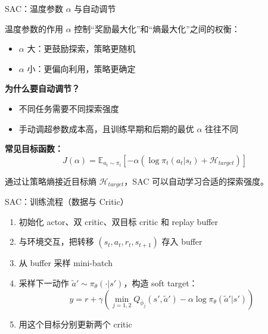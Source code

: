 \documentclass{beamer}
\begin{document}
\begin{frame}{SAC：温度参数 $\alpha$ 与自动调节}
    \begin{block}{温度参数的作用}
        $\alpha$ 控制“奖励最大化”和“熵最大化”之间的权衡：
        \begin{itemize}
            \item $\alpha$ 大：更鼓励探索，策略更随机
            \item $\alpha$ 小：更偏向利用，策略更确定
        \end{itemize}
    \end{block}

    \textbf{为什么要自动调节？}
    \begin{itemize}
        \item 不同任务需要不同探索强度
        \item 手动调超参数成本高，且训练早期和后期的最优 $\alpha$ 往往不同
    \end{itemize}

    \textbf{常见目标函数：}
    \[
    J(\alpha) = \mathbb{E}_{a_t \sim \pi_t}\left[-\alpha \left( \log \pi_t(a_t|s_t) + \mathcal{H}_{target} \right)\right]
    \]

    {\small 通过让策略熵接近目标熵 $\mathcal{H}_{target}$，SAC 可以自动学习合适的探索强度。}
\end{frame}

\begin{frame}{SAC：训练流程（数据与 Critic）}
    \begin{enumerate}
        \item 初始化 actor、双 critic、双目标 critic 和 replay buffer
        \item 与环境交互，把转移 $(s_t,a_t,r_t,s_{t+1})$ 存入 buffer
        \item 从 buffer 采样 mini-batch
        \item 采样下一动作 $\tilde{a}' \sim \pi_\theta(\cdot|s')$，构造 soft target：
        \[
        y = r + \gamma \left( \min_{j=1,2} Q_{\bar{\phi}_j}(s',\tilde{a}') - \alpha \log \pi_\theta(\tilde{a}'|s') \right)
        \]
        \item 用这个目标分别更新两个 critic
    \end{enumerate}
\end{frame}
\end{document}
